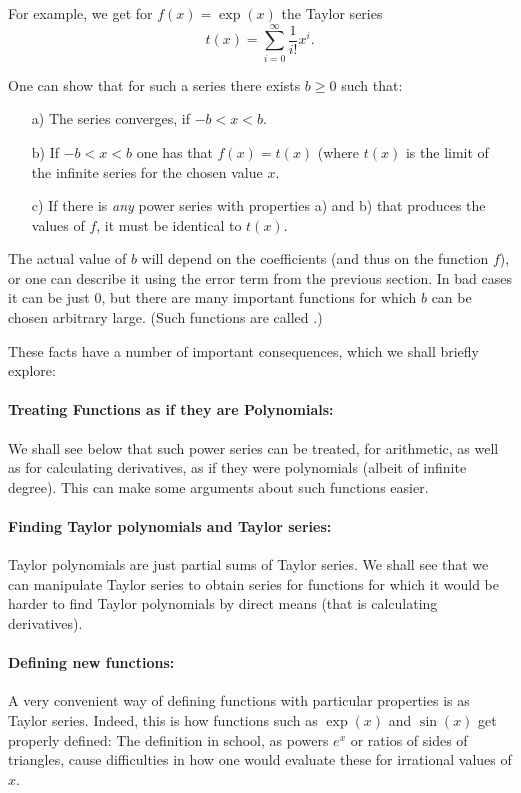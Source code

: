 For example, we get for $f(x)=\exp(x)$ the Taylor series
\[
t(x)=\sum_{i=0}^\infty\frac{1}{i!} x^i.
\]

One can show that for such a series there exists $b\ge 0$ such that:
\begin{itemize}
\item[a)]
The
series converges, if $-b<x<b$.
\item[b)]
If $-b<x<b$ one has that $f(x)=t(x)$ (where $t(x)$ is the limit of the
infinite series for the chosen value $x$.
\item[c)] If there is {\em any} power series with properties a) and b) that
produces the values of $f$, it must be identical to $t(x)$.
\end{itemize}
The actual value of $b$ will depend on the
coefficients (and thus on the function $f$), or one can describe it using
the error term from the previous section.
In bad cases it can be just $0$, but there are many important functions for
which $b$ can be chosen arbitrary large. (Such functions are called
.)
\medskip

These facts have a number of important consequences, which we shall briefly
explore:
\paragraph{Treating Functions as if they are Polynomials:}
We shall see below that such power series can be treated, for arithmetic, as
well as for calculating derivatives, as if they were polynomials (albeit of
infinite degree). This can make some arguments about such functions easier.

\paragraph{Finding Taylor polynomials and Taylor series:} Taylor polynomials are just partial
sums of Taylor series. We shall see that we can manipulate Taylor series to
obtain series for functions for which it would be harder to find Taylor
polynomials by direct means (that is calculating derivatives).

\paragraph{Defining new functions:} A very convenient way of defining
functions with particular properties is as Taylor series. Indeed, this is
how functions such as $\exp(x)$ and $\sin(x)$ get properly defined: The
definition in school, as powers $e^x$ or ratios of sides of triangles, cause
difficulties
in how one would evaluate these for irrational values of $x$.

